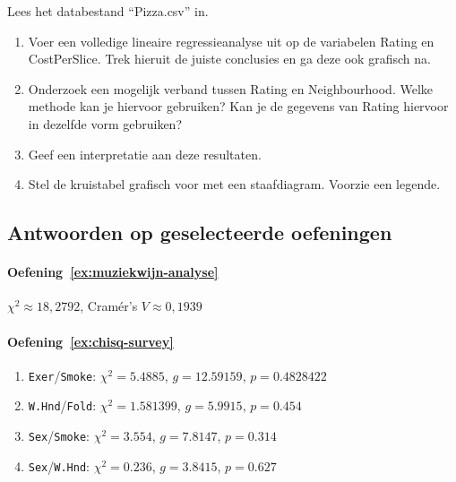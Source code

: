 \begin{exercise}
  \label{ex:pizza}
  Lees het databestand ``Pizza.csv'' in.
  \begin{enumerate}
    \item Voer een volledige lineaire regressieanalyse uit op de variabelen Rating en CostPerSlice. Trek hieruit de juiste conclusies en ga deze ook grafisch na.
    \item Onderzoek een mogelijk verband tussen Rating en Neighbourhood. Welke methode kan je hiervoor gebruiken? Kan je de gegevens van Rating hiervoor in dezelfde vorm gebruiken?
    \item Geef een interpretatie aan deze resultaten.
    \item Stel de kruistabel grafisch voor met een staafdiagram.  Voorzie een legende.
  \end{enumerate}
\end{exercise}





\subsection{Antwoorden op geselecteerde oefeningen}
\label{ssec:analyse-2-variabelen-oplossingen}

\paragraph{Oefening~\ref{ex:muziekwijn-analyse}}

$\chi^2 \approx 18,2792$, Cramér's $V \approx 0,1939$

\paragraph{Oefening~\ref{ex:chisq-survey}}

\begin{enumerate}
  \item \texttt{Exer}/\texttt{Smoke}: $\chi^2 = 5.4885$, $g = 12.59159$, $p = 0.4828422$
  \item \texttt{W.Hnd}/\texttt{Fold}: $\chi^2 = 1.581399$, $g = 5.9915$, $p = 0.454$
  \item \texttt{Sex}/\texttt{Smoke}: $\chi^2 = 3.554$, $g = 7.8147$, $p = 0.314$
  \item \texttt{Sex}/\texttt{W.Hnd}: $\chi^2 = 0.236$, $g = 3.8415$, $p = 0.627$
\end{enumerate}

